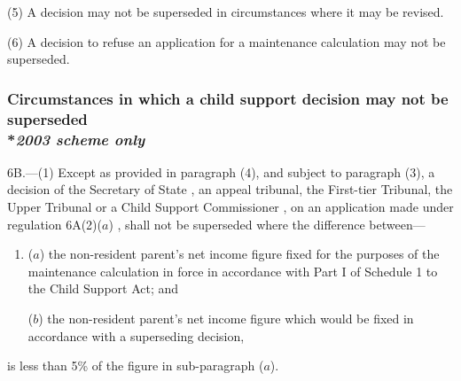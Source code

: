 \documentclass[12pt,a4paper]{article}
\begin{document}
(5) A decision may not be superseded in circumstances where it may be revised.

(6) A decision to refuse an application for a maintenance calculation may not be superseded.


\subsubsection[6B. Circumstances in which a child support decision may not be superseded]{Circumstances in which a child support decision may not be superseded\\*\emph{2003 scheme only}}

6B.---(1)  Except as provided in paragraph (4), and subject to paragraph (3), a decision of the 
Secretary of State%
, 
an appeal tribunal, the First-tier Tribunal, the Upper Tribunal or a Child Support Commissioner%
, on an application made under regulation %
6A(2)($a$)%
, shall not be superseded where the difference between—
\begin{enumerate}\item[]
($a$) the non-resident parent’s net income figure fixed for the purposes of the maintenance calculation in force in accordance with Part I of Schedule 1 to the Child Support Act; and

($b$) the non-resident parent’s net income figure which would be fixed in accordance with a superseding decision,
\end{enumerate}
is less than 5\% of the figure in sub-paragraph ($a$).
\end{document}
